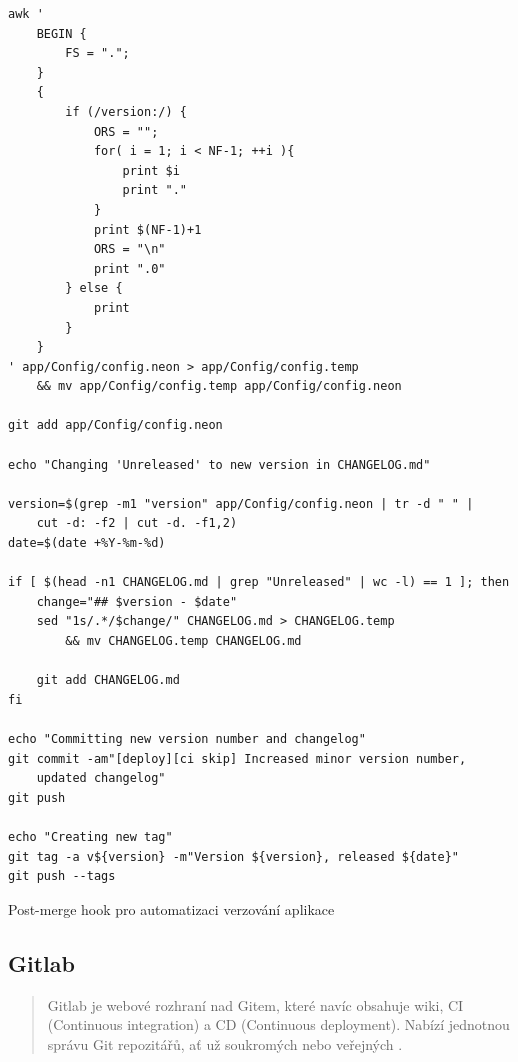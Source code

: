 \begin{listing}[H]
	\begin{verbatim}
awk '
    BEGIN { 
        FS = ".";
    }
    {
        if (/version:/) {
            ORS = "";
            for( i = 1; i < NF-1; ++i ){
                print $i
                print "."
            }
            print $(NF-1)+1
            ORS = "\n"
            print ".0"
        } else {
            print
        }
    }
' app/Config/config.neon > app/Config/config.temp
    && mv app/Config/config.temp app/Config/config.neon

git add app/Config/config.neon

echo "Changing 'Unreleased' to new version in CHANGELOG.md"

version=$(grep -m1 "version" app/Config/config.neon | tr -d " " |
    cut -d: -f2 | cut -d. -f1,2)
date=$(date +%Y-%m-%d)

if [ $(head -n1 CHANGELOG.md | grep "Unreleased" | wc -l) == 1 ]; then
    change="## $version - $date"
    sed "1s/.*/$change/" CHANGELOG.md > CHANGELOG.temp
        && mv CHANGELOG.temp CHANGELOG.md

    git add CHANGELOG.md
fi

echo "Committing new version number and changelog"
git commit -am"[deploy][ci skip] Increased minor version number,
    updated changelog"
git push

echo "Creating new tag"
git tag -a v${version} -m"Version ${version}, released ${date}"
git push --tags
	\end{verbatim}
	\caption{Post-merge hook pro automatizaci verzování aplikace} \label{code:hook}
\end{listing}

\subsection{Gitlab} \label{version:gitlab}

\begin{quote}
Gitlab je webové rozhraní nad Gitem, které navíc obsahuje wiki, CI (Continuous integration) a CD (Continuous deployment). Nabízí jednotnou správu Git repozitářů, ať už soukromých nebo veřejných \cite{gitlab}.
\end{quote}

